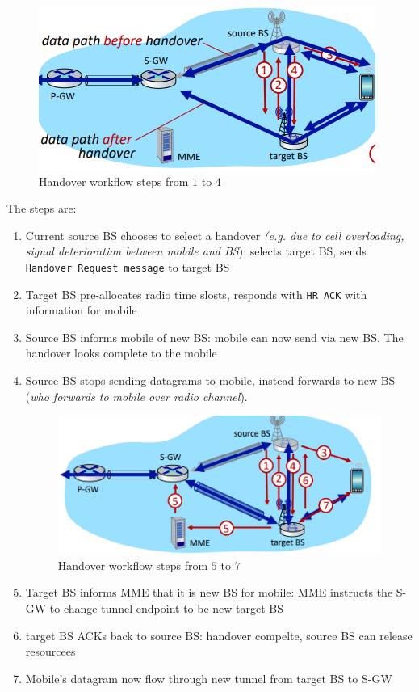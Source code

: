 \documentclass[10pt,a4paper]{report}
\theoremstyle{definition}
\begin{document}
\begin{figure}[h]
	\centering\includegraphics[scale=0.60]{images/Pasted image 20230322120944.png}
	\caption{Handover workflow steps from $1$ to $4$}
	\label{handover-BS}
\end{figure}
The steps are:
\begin{enumerate}
	\item 
	Current source BS chooses to select a handover \textit{(e.g. due to cell overloading, signal	deterioration between mobile and BS}): selects target BS, sends \texttt{Handover Request message} to target BS
	\item 
	Target BS pre-allocates radio time slosts, responds with \texttt{HR ACK} with information for mobile
	\item 
	Source BS informs mobile of new BS: mobile can now send via new BS. The handover looks complete to the mobile
	\item 
	Source BS stops sending datagrams to mobile, instead forwards to new BS (\textit{who forwards to mobile over radio channel}).
	\begin{figure}[h]
		\centering\includegraphics[scale=0.50]{images/Pasted image 20230322121438.png}
		\caption{Handover workflow steps from $5$ to $7$}
		\label{handover-BS}
	\end{figure}
	
	\item 
	Target BS informs MME that it is new BS for mobile: MME instructs the S-GW to change tunnel endpoint to be new target BS
	\item 
	target BS ACKs back to source BS: handover compelte, source BS can release resourcees
	\item 
	Mobile's datagram now flow through new tunnel from target BS to S-GW
\end{enumerate}
\end{document}
